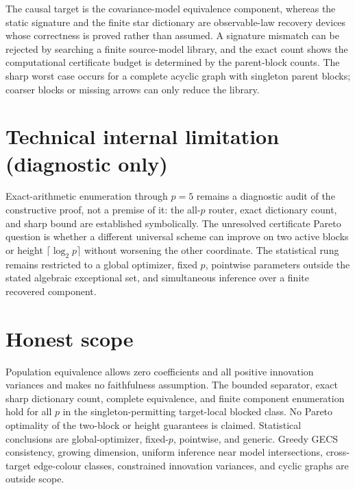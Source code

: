 \documentclass{article}
\begin{document}
The causal target is the covariance-model equivalence component, whereas the static signature and the finite star dictionary are observable-law recovery devices whose correctness is proved rather than assumed. A signature mismatch can be rejected by searching a finite source-model library, and the exact count shows the computational certificate budget is determined by the parent-block counts. The sharp worst case occurs for a complete acyclic graph with singleton parent blocks; coarser blocks or missing arrows can only reduce the library.

\section*{Technical internal limitation (diagnostic only)}

Exact-arithmetic enumeration through \(p=5\) remains a diagnostic audit of the constructive proof, not a premise of it: the all-\(p\) router, exact dictionary count, and sharp bound are established symbolically. The unresolved certificate Pareto question is whether a different universal scheme can improve on two active blocks or height \(\lceil\log_2p\rceil\) without worsening the other coordinate. The statistical rung remains restricted to a global optimizer, fixed \(p\), pointwise parameters outside the stated algebraic exceptional set, and simultaneous inference over a finite recovered component.

\section{Honest scope}

Population equivalence allows zero coefficients and all positive innovation variances and makes no faithfulness assumption. The bounded separator, exact sharp dictionary count, complete equivalence, and finite component enumeration hold for all \(p\) in the singleton-permitting target-local blocked class. No Pareto optimality of the two-block or height guarantees is claimed. Statistical conclusions are global-optimizer, fixed-\(p\), pointwise, and generic. Greedy GECS consistency, growing dimension, uniform inference near model intersections, cross-target edge-colour classes, constrained innovation variances, and cyclic graphs are outside scope.
\end{document}
